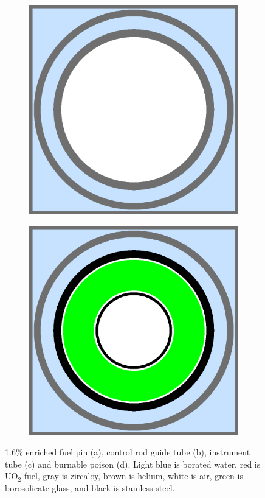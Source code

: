 \begin{figure}[h!]
\begin{subfigure}{.5\textwidth}
  \caption{}
  \label{fig:chap7-pin-3.1}
\end{subfigure}
\begin{subfigure}{.5\textwidth}
  \centering
  \includegraphics[width=0.9\linewidth]{figures/benchmarks/instr-tube}
  \caption{}
  \label{fig:chap7-guide-tube}
\end{subfigure}%
\begin{subfigure}{.5\textwidth}
  \centering
  \includegraphics[width=0.9\linewidth]{figures/benchmarks/burn-abs}
  \caption{}
  \label{fig:chap7-instr-tube}
\end{subfigure}%
\caption[BEAVRS pin cell geometries]{1.6\% enriched fuel pin (a), control rod guide tube (b), instrument tube (c) and burnable poison (d). Light blue is borated water, red is UO$_2$ fuel, gray is zircaloy, brown is helium, white is air, green is borosolicate glass, and black is stainless steel.}
\label{fig:chap7-pin-cells}
\end{figure}

